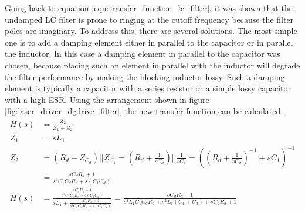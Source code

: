 Going back to equation \ref{eqn:transfer_function_lc_filter}, it was shown that the undamped LC filter is prone to ringing at the cutoff frequency because the filter poles are imaginary. To address this, there are several solutions. The most simple one is to add a damping element either in parallel to the capacitor or in parallel the inductor. In this case a damping element in parallel to the capacitor was chosen, because placing such an element in parallel with the inductor will degrade the filter performance by making the blocking inductor lossy. Such a damping element is typically a capacitor with a series resistor or a simple lossy capacitor with a high ESR. Using the arrangement shown in figure \ref{fig:laser_driver_dgdrive_filter}, the new transfer function can be calculated.
\begin{align}
    H(s) &= \frac{Z_2}{Z_1 + Z_2} \nonumber\\
    Z_1 &= sL_1 \nonumber\\
    Z_2 &= \left(R_d + Z_{C_d}\right) || Z_{C_1} = \left(R_d + \frac{1}{s C_d}\right) || \frac{1}{s C_1} = \left(\left(R_d + \frac{1}{sC_d}\right)^{-1} + sC_1\right)^{-1} \nonumber\\
    &= \frac{s C_d R_d +1}{s^2 C_1 C_d R_d + s \left(C_1 C_d\right)}\\
    H(s) &= \frac{\frac{s C_d R_d +1}{s^2 C_1 C_d R_d + s \left(C_1 C_d\right)}}{s L_1  + \frac{s C_d R_d +1}{s^2 C_1 C_d R_d + s \left(C_1 C_d\right)}} = \frac{s C_d R_d +1}{s^3 L_1 C_1 C_d R_d + s^2 L_1 \left(C_1 + C_d\right) + s C_d R_d +1 }
\end{align}

